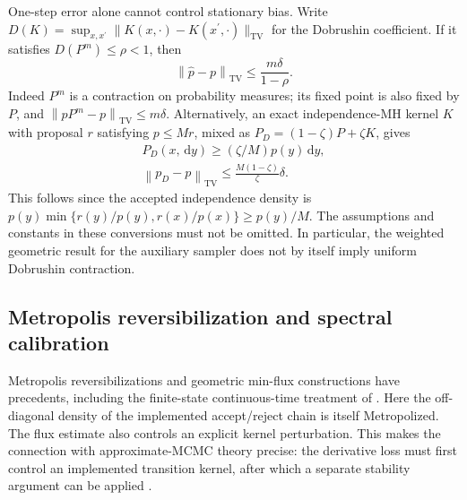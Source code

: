 \documentclass[pdflatex,iicol,sn-mathphys-ay]{sn-jnl}
\theoremstyle{definition}\newtheorem{definition}[theorem]{Definition}
\theoremstyle{remark}\newtheorem{remark}[theorem]{Remark}
\numberwithin{equation}{section}
\newcommand{\norm}[1]{\left\lVert#1\right\rVert}\newcommand{\TV}{\mathrm{TV}}
\newcommand{\dd}{\,\mathrm d}\newcommand{\cA}{c_\alpha}\newcommand{\sg}{\operatorname{sigmoid}}
\newcommand{\1}{\mathbf 1}
\begin{document}
One-step error alone cannot control stationary bias. Write $D(K)=\sup_{x,x^{\prime}}\|K(x,\cdot)-K(x^{\prime},\cdot)\|_{\TV}$ for the Dobrushin coefficient. If it satisfies $D(P^m)\le\rho<1$, then
\begin{equation}
\norm{\widehat p-p}_{\TV}\le\frac{m\delta}{1-\rho}.\label{eq:mixingconversion}
\end{equation}
Indeed $P^m$ is a contraction on probability measures; its fixed point is also fixed by $P$, and $\norm{pP^m-p}_{\TV}\le m\delta$. Alternatively, an exact independence-MH kernel $K$ with proposal $r$ satisfying $p\le Mr$, mixed as $P_D=(1-\zeta)P+\zeta K$, gives
\begin{equation}
\begin{gathered}
P_D(x,\dd y)\ge(\zeta/M)p(y)\dd y,\\
\norm{p_D-p}_{\TV}\le\frac{M(1-\zeta)}\zeta\delta.
\end{gathered}\label{eq:defensive}
\end{equation}
This follows since the accepted independence density is
$p(y)\min\{r(y)/p(y),r(x)/p(x)\}\ge p(y)/M$.
The assumptions and constants in these conversions must not be omitted. In particular, the weighted geometric result for the auxiliary sampler does not by itself imply uniform Dobrushin contraction.


\subsection{Metropolis reversibilization and spectral calibration}\label{sec:spectralcalibration}
Metropolis reversibilizations and geometric min-flux constructions have precedents, including the finite-state continuous-time treatment of \citet{choi}. Here the off-diagonal density of the implemented accept/reject chain is itself Metropolized. The flux estimate also controls an explicit kernel perturbation. This makes the connection with approximate-MCMC theory precise: the derivative loss must first control an implemented transition kernel, after which a separate stability argument can be applied \citep{mitrophanov,alquierNoisy,medina,rudolf}.
\end{document}
